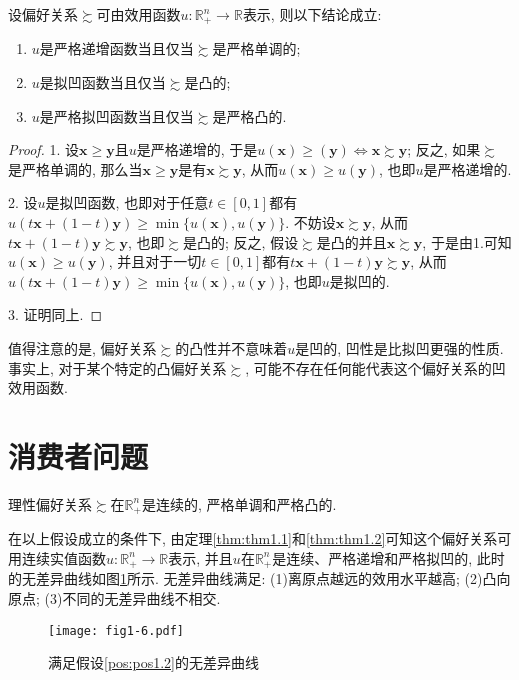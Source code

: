\documentclass[cn, 12pt, math=mtpro2, bibstyle=apa, blue]{elegantbook}
\newcommand{\R}{\mathbb{R}}
\newcommand{\x}{\mathbf{x}}
\begin{document}
  \begin{theorem}\label{thm:thm1.2}
    设偏好关系$\succsim$可由效用函数$u:\R_+^n\to\R$表示, 则以下结论成立:
    \begin{enumerate}[label=\arabic*.]
      \item $u$是严格递增函数当且仅当$\succsim$是严格单调的;
      \item $u$是拟凹函数当且仅当$\succsim$是凸的;
      \item $u$是严格拟凹函数当且仅当$\succsim$是严格凸的.
    \end{enumerate}
  \end{theorem}
  \begin{proof}
    1. 设$\x\ge \mathbf{y}$且$u$是严格递增的, 于是$u(\x)\geq (\mathbf{y})\Leftrightarrow \x\succsim \mathbf{y}$; 反之, 如果$\succsim$是严格单调的, 那么当$\x\ge\mathbf{y}$是有$\x\succsim\mathbf{y}$, 从而$u(\x)\ge u(\mathbf{y})$, 也即$u$是严格递增的.

    2. 设$u$是拟凹函数, 也即对于任意$t\in [0,1]$都有$u(t\x+(1-t)\mathbf{y})\geq \min\{u(\x), u(\mathbf{y})\}$. 不妨设$\x\succsim \mathbf{y}$, 从而$t\x+(1-t)\mathbf{y}\succsim \mathbf{y}$, 也即$\succsim$是凸的; 反之, 假设$\succsim$是凸的并且$\x\succsim\mathbf{y}$, 于是由1.可知$u(\x)\ge u(\mathbf{y})$, 并且对于一切$t\in[0,1]$都有$t\x+(1-t)\mathbf{y}\succsim \mathbf{y}$, 从而$u(t\x+(1-t)\mathbf{y})\geq \min\{u(\x), u(\mathbf{y})\}$, 也即$u$是拟凹的.

    3. 证明同上.
  \end{proof}
  值得注意的是, 偏好关系$\succsim$的凸性并不意味着$u$是凹的, 凹性是比拟凹更强的性质. 事实上, 对于某个特定的凸偏好关系$\succsim$, 可能不存在任何能代表这个偏好关系的凹效用函数.
\section{消费者问题}
\begin{postulate}\label{pos:pos1.2}
理性偏好关系$\succsim$在$\R_+^n$是连续的, 严格单调和严格凸的.
\end{postulate}
在以上假设成立的条件下, 由定理\ref{thm:thm1.1}和\ref{thm:thm1.2}可知这个偏好关系可用连续实值函数$u:\R^n_+\to\R$表示, 并且$u$在$\R^n_+$是连续、严格递增和严格拟凹的, 此时的无差异曲线如图\ref{fig1.6}所示. 无差异曲线满足: (1)离原点越远的效用水平越高; (2)凸向原点; (3)不同的无差异曲线不相交.
\begin{figure}[htbp!]
  \centering
  \texttt{[image: fig1-6.pdf]}
  \caption{满足假设\ref{pos:pos1.2}的无差异曲线}\label{fig1.6}
\end{figure}
\end{document}
